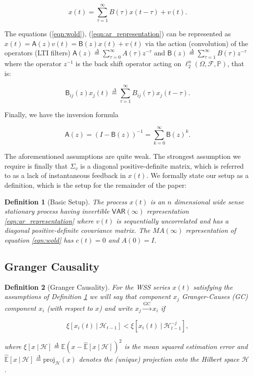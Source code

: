\documentclass{statsoc}
\def\gc{\overset{\text{GC}}{\rightarrow}}  %
\def\VAR{\mathsf{VAR}}  %
\def\B{\mathsf{B}}  %
\def\A{\mathsf{A}}  %
\def\H{\mathcal{H}}  %
\newcommand{\linE}[2]{\hat{\E}[#1\ |\ #2]}  %
\newcommand{\linEerr}[2]{\xi[#1\ |\ #2]}  %
\newtheorem{definition}{Definition}
\def\defeq{\overset{\Delta}{=}}  %
\def\H{\mathcal{H}}  %
\def\E{\mathbb{E}}  %
\begin{document}
\begin{equation}
  \label{eqn:ar_representation}
  x(t) = \sum_{\tau = 1}^\infty B(\tau) x(t - \tau) + v(t).
\end{equation}

The equations (\ref{eqn:wold}), (\ref{eqn:ar_representation}) can be
represented as $x(t) = \A(z)v(t) = \B(z)x(t) + v(t)$ via the action
(convolution) of the operators (LTI filters)
$\A(z) \defeq \sum_{\tau = 0}^\infty A(\tau)z^{-\tau}$ and
$\B(z) \defeq \sum_{\tau = 1}^\infty B(\tau)z^{-\tau}$ where the
operator $z^{-1}$ is the back shift operator acting on
$\ell_2^n(\Omega, \mathcal{F}, \mathbb{P})$, that is:

\begin{equation}
  \label{eqn:filter_action}
  \B_{ij}(z)x_j(t) \defeq \sum_{\tau = 1}^\infty B_{ij}(\tau)x_j(t - \tau).
\end{equation}

Finally, we have the inversion formula

\begin{equation}
  \label{eqn:lsi_inversion}
  \A(z) = (I - \B(z))^{-1} = \sum_{k = 0}^\infty \B(z)^k.
\end{equation}

The aforementioned assumptions are quite weak.  The strongest
assumption we require is finally that $\Sigma_v$ is a diagonal
positive-definite matrix, which is referred to as a lack of
instantaneous feedback in $x(t)$.  We formally state our setup as a
definition, which is the setup for the remainder of the paper:

\begin{definition}[Basic Setup]
  \label{def:basic_setup}
  The process $x(t)$ is an $n$ dimensional wide sense stationary
  process having invertible $\VAR(\infty)$ representation
  \eqref{eqn:ar_representation} where $v(t)$ is sequentially
  uncorrelated and has a diagonal positive-definite covariance matrix.
  The $MA(\infty)$ representation of equation \eqref{eqn:wold} has
  $c(t) = 0$ and $A(0) = I$.
\end{definition}

\subsection{Granger Causality}

\begin{definition}[Granger Causality]
  \label{def:granger_causality}
  For the WSS series $x(t)$ satisfying the assumptions of Definition
  \ref{def:basic_setup} we will say that component $x_j$
  \textit{Granger-Causes} (GC) component $x_i$ (with respect to $x$)
  and write $x_j \gc x_i$ if

\begin{equation}
  \linEerr{x_i(t)}{\H_{t - 1}} < \linEerr{x_i(t)}{\H^{-j}_{t - 1}},
\end{equation}

where $\xi[x \ |\ \H] \defeq \E (x - \linE{x}{\H})^2$ is the mean
squared estimation error and $\linE{x}{\H} \defeq \text{proj}_{\H}(x)$
denotes the (unique) projection onto the Hilbert space $\H$.
\end{definition}
\end{document}

